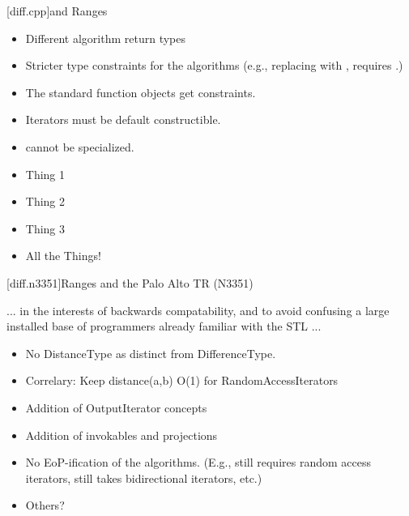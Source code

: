 
[diff.cpp]{\Cpp and Ranges}

\pnum


\begin{itemize}
\item Different algorithm return types
\item Stricter type constraints for the algorithms (e.g., replacing  with
,  requires .)
\item The standard function objects get constraints.
\item Iterators must be default constructible.
\item {} cannot be specialized.
\item Thing 1
\item Thing 2
\item Thing 3
\item All the Things!
\end{itemize}

[diff.n3351]{Ranges and the Palo Alto TR (N3351)}

\pnum


... in the interests of backwards compatability, and to avoid confusing a large installed base of
programmers already familiar with the STL ...

\begin{itemize}
\item No DistanceType as distinct from DifferenceType.
\item Correlary: Keep distance(a,b) O(1) for RandomAccessIterators
\item Addition of OutputIterator concepts
\item Addition of invokables and projections
\item No EoP-ification of the algorithms. (E.g.,  still requires random access
      iterators,  still takes bidirectional iterators, etc.)
\item Others?
\end{itemize}

